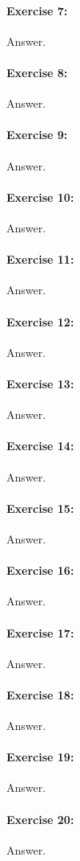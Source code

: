\documentclass{article}
\begin{document}
\paragraph{Exercise 7:}
Answer.
\paragraph{Exercise 8:}
Answer.
\paragraph{Exercise 9:}
Answer.
\paragraph{Exercise 10:}
Answer.
\paragraph{Exercise 11:}
Answer.
\paragraph{Exercise 12:}
Answer.
\paragraph{Exercise 13:}
Answer.
\paragraph{Exercise 14:}
Answer.
\paragraph{Exercise 15:}
Answer.
\paragraph{Exercise 16:}
Answer.
\paragraph{Exercise 17:}
Answer.
\paragraph{Exercise 18:}
Answer.
\paragraph{Exercise 19:}
Answer.
\paragraph{Exercise 20:}
Answer.
\end{document}
